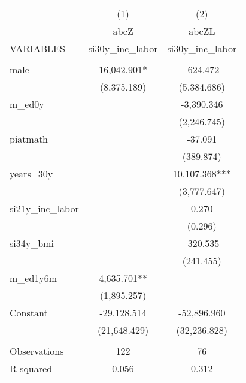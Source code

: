 \begin{tabular}{lcc} \hline
 & (1) & (2) \\
 & abcZ & abcZL \\
VARIABLES & si30y\_inc\_labor & si30y\_inc\_labor \\ \hline
 &  &  \\
male & 16,042.901* & -624.472 \\
 & (8,375.189) & (5,384.686) \\
m\_ed0y &  & -3,390.346 \\
 &  & (2,246.745) \\
piatmath &  & -37.091 \\
 &  & (389.874) \\
years\_30y &  & 10,107.368*** \\
 &  & (3,777.647) \\
si21y\_inc\_labor &  & 0.270 \\
 &  & (0.296) \\
si34y\_bmi &  & -320.535 \\
 &  & (241.455) \\
m\_ed1y6m & 4,635.701** &  \\
 & (1,895.257) &  \\
Constant & -29,128.514 & -52,896.960 \\
 & (21,648.429) & (32,236.828) \\
 &  &  \\
Observations & 122 & 76 \\
 R-squared & 0.056 & 0.312 \\ \hline
\end{tabular}
